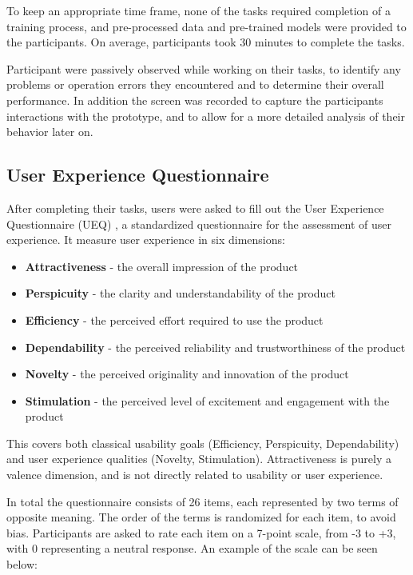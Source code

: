 To keep an appropriate time frame, none of the tasks required completion of a training process, and pre-processed data and pre-trained models were provided to the participants.
On average, participants took 30 minutes to complete the tasks.

Participant were passively observed while working on their tasks, to identify any problems or operation errors they encountered and to determine their overall performance.
In addition the screen was recorded to capture the participants interactions with the prototype, and to allow for a more detailed analysis of their behavior later on.

\subsection*{User Experience Questionnaire}
\label{sec:methodology:study:ueq}

After completing their tasks, users were asked to fill out the User Experience Questionnaire (UEQ) \cite{laugwitz_construction_2008}, a standardized questionnaire for the assessment of user experience.
It measure user experience in six dimensions:

\begin{itemize}
  \item \textbf{Attractiveness} - the overall impression of the product
  \item \textbf{Perspicuity} - the clarity and understandability of the product
  \item \textbf{Efficiency} - the perceived effort required to use the product
  \item \textbf{Dependability} - the perceived reliability and trustworthiness of the product
  \item \textbf{Novelty} - the perceived originality and innovation of the product
  \item \textbf{Stimulation} - the perceived level of excitement and engagement with the product
\end{itemize}

This covers both classical usability goals (Efficiency, Perspicuity, Dependability) and user experience qualities (Novelty, Stimulation).
Attractiveness is purely a valence dimension, and is not directly related to usability or user experience.

In total the questionnaire consists of 26 items, each represented by two terms of opposite meaning. 
The order of the terms is randomized for each item, to avoid bias.
Participants are asked to rate each item on a 7-point scale, from -3 to +3, with 0 representing a neutral response.
An example of the scale can be seen below:

